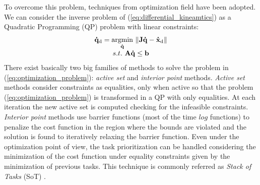 To overcome this problem, techniques from optimization field have been adopted.
We can consider the inverse problem of (\ref{eq:differential_kineamtics}) as a Quadratic Programming (QP) problem with linear constraints:
\begin{equation} 
\label{eq:optimization_problem}
\begin{array}{c}
\mathbf{\dot{q}}_\text{d} = \underset{\mathbf{\dot{q}}}{\operatorname{argmin}} \ \Arrowvert \mathbf{J} \mathbf{\dot{q}}-\mathbf{\dot{x}}_\text{d} \Arrowvert\\
s.t. \ \mathbf{A}\mathbf{\dot{q}} \leq \mathbf{b}
\end{array}
\end{equation}
There exist basically two big families of methods to solve the problem in (\ref{eq:optimization_problem}): \emph{active set} and \emph{interior point} methods. 
\emph{Active set} methods consider constraints as equalities, only when active so that the problem (\ref{eq:optimization_problem}) is transformed in a QP with only equalities. At each iteration the new active set is computed checking for the infeasible constraints.
\emph{Interior point} methods use barrier functions (most of the time $log$ functions) to penalize the cost function in the region where the bounds are violated and the solution is found to iteratively relaxing the barrier function.
Even under the optimization point of view, the task prioritization can be handled considering the minimization of the cost function under equality constraints given by the minimization of previous tasks. This technique is commonly referred as \emph{Stack of Tasks} (SoT) \cite{mansard:icar:09}. 

